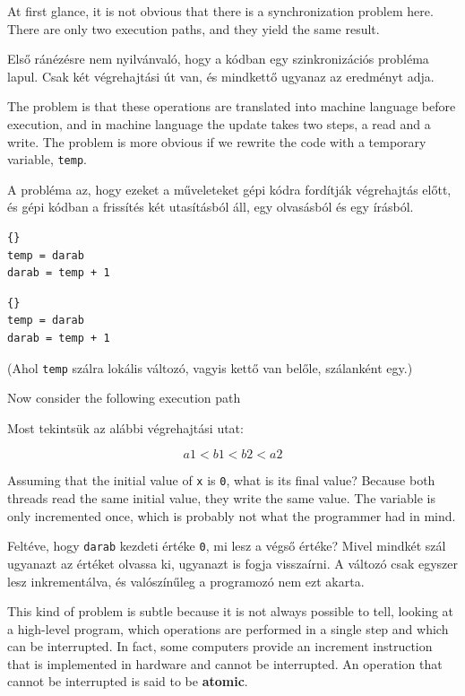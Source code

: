 \documentclass{book}
\begin{document}
At first glance, it is not obvious that there is a synchronization
problem here.  There are only two execution paths, and they
yield the same result.

Első ránézésre nem nyilvánvaló, hogy a kódban egy szinkronizációs probléma
lapul. Csak két végrehajtási út van, és mindkettő ugyanaz az eredményt
adja.

The problem is that these operations are translated into
machine language before execution, and in machine language
the update takes two steps, a read and a write.
The problem is more obvious if we rewrite the code with a temporary
variable, {\tt temp}.

A probléma az, hogy ezeket a műveleteket gépi kódra fordítják
végrehajtás előtt, és gépi kódban a frissítés két utasításból
áll, egy olvasásból és egy írásból.

\begin{minipage}[t]{2in}
\begin{lstlisting}[title={„A” szál}]{}
temp = darab
darab = temp + 1
\end{lstlisting}
\end{minipage}
\hfill
\begin{minipage}[t]{2in}
\begin{lstlisting}[title={„B” szál}]{}
temp = darab
darab = temp + 1
\end{lstlisting}
\end{minipage}

(Ahol {\tt temp} szálra lokális változó, vagyis
kettő van belőle, szálanként egy.)

Now consider the following execution path 

Most tekintsük az alábbi végrehajtási utat:

\[  a1 < b1 < b2 < a2  \]

Assuming that the
initial value of {\tt x} is {\tt 0},
what is its final value?  Because
both threads read the same initial value, they write
the same value.  The variable is only incremented once, which
is probably not what the programmer had in mind.

Feltéve, hogy {\tt darab} kezdeti értéke {\tt 0},
mi lesz a végső értéke? Mivel mindkét szál ugyanazt az értéket
olvassa ki, ugyanazt is fogja visszaírni. A változó csak
egyszer lesz inkrementálva, és valószínűleg a programozó nem
ezt akarta.

This kind of problem is subtle because it is not always possible to
tell, looking at a high-level program, which operations are
performed in a single step and which can be interrupted.
In fact, some computers provide an increment instruction that
is implemented in hardware and cannot be interrupted.
An operation that cannot be interrupted is said to be
{\bf atomic}.
\end{document}
